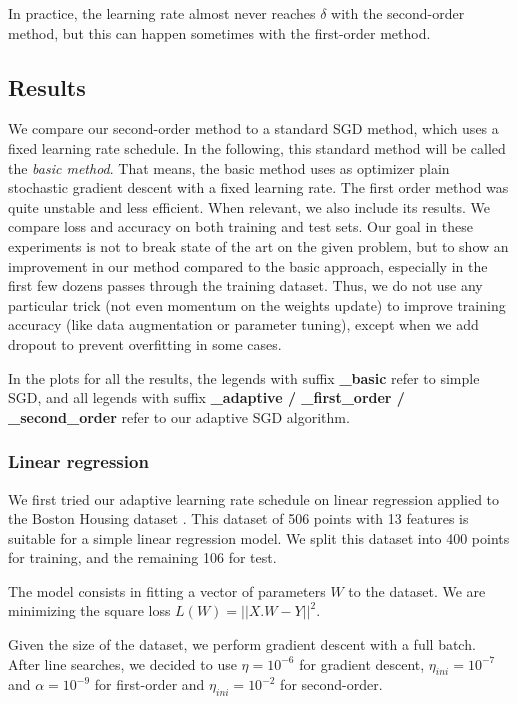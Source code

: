 \documentclass{article}
\begin{document}
  In practice, the learning rate almost never reaches $\delta$ with the second-order method, but this can happen sometimes with the first-order method. 
  
  \subsection{Results} 
  
  We compare our second-order method to a standard SGD method, which uses a fixed learning rate schedule. In the following, this standard method will be called the \emph{basic method}. That means, the basic method uses as optimizer plain stochastic gradient descent with a fixed learning rate. The first order method was quite unstable and less efficient. When relevant, we also include its results. We compare loss and accuracy on both training and test sets. Our goal in these experiments is not to break state of the art on the given problem, but to show an improvement in our method compared to the basic approach, especially in the first few dozens passes through the training dataset. Thus, we do not use any particular trick (not even momentum on the weights update) to improve training accuracy (like data augmentation or parameter tuning), except when we add dropout to prevent overfitting in some cases.
  
  In the plots for all the results, the legends with suffix \textbf{\_basic} refer to simple SGD, and all legends with suffix \textbf{\_adaptive / \_first\_order / \_second\_order} refer to our adaptive SGD algorithm.
  
  \subsubsection{Linear regression}
  
  We first tried our adaptive learning rate schedule on linear regression applied to the Boston Housing dataset \cite{boston}. This dataset of 506 points with 13 features is suitable for a simple linear regression model. We split this dataset into 400 points for training, and the remaining 106 for test.
  
  The model consists in fitting a vector of parameters $W$ to the dataset. We are minimizing the square loss $L(W)=||X.W-Y||^{2}$.
  
  Given the size of the dataset, we perform gradient descent with a full batch. After line searches, we decided to use $\eta=10^{-6}$ for gradient descent, $\eta_{ini} = 10^{-7}$ and $\alpha = 10^{-9}$ for first-order and $\eta_{ini}=10^{-2}$ for second-order.
\end{document}

